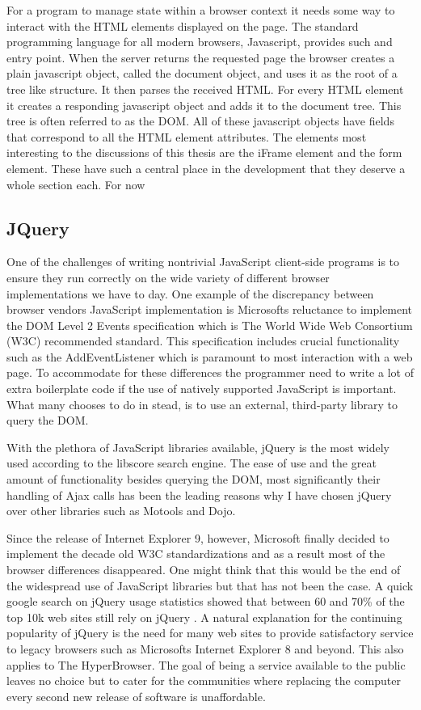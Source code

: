 \documentclass[english]{ifimaster}
\begin{document}
For a program to manage state within a browser context it needs some way to interact with the HTML elements displayed on the page. The standard programming language for all modern browsers, Javascript, provides such and entry point. When the server returns the requested page the browser creates a plain javascript object, called the document object, and uses it as the root of a tree like structure. It then parses the received HTML. For every HTML element it creates a responding javascript object and adds it to the document tree. This tree is often referred to as the DOM. All of these javascript objects have fields that correspond to all the HTML element attributes. The elements most interesting to the discussions of this thesis are the iFrame element and the form element. These have such a central place in the development that they deserve a whole section each. For now  

\subsection{JQuery}
One of the challenges of writing nontrivial JavaScript client-side programs is to ensure they run correctly on the wide variety of different browser implementations we have to day\parencite[p. 325]{flanagan}. One example of the discrepancy between browser vendors JavaScript implementation is Microsofts reluctance to implement the DOM Level 2 Events specification which is The World Wide Web Consortium (W3C) recommended standard\parencite{w3c}. This specification includes crucial functionality such as the AddEventListener which is paramount to most interaction with a web page. To accommodate for these differences the programmer need to write a lot of extra boilerplate code if the use of natively supported JavaScript is important. What many chooses to do in stead, is to use an external, third-party library to query the DOM. 

With the plethora of JavaScript libraries available, jQuery is the most widely used according to the libscore search engine\parencite{infoWorld}. The ease of use and the great amount of functionality besides querying the DOM, most significantly their handling of Ajax calls has been the leading reasons why I have chosen jQuery over other libraries such as Motools and Dojo. 

Since the release of Internet Explorer 9, however, Microsoft finally decided to implement the decade old W3C standardizations and as a result most of the browser differences disappeared. One might think that this would be the end of the widespread use of JavaScript libraries but that has not been the case. A quick google search on jQuery usage statistics showed that between 60 and 70\% of the top 10k web sites still rely on jQuery \parencite{jQueryWiki} \parencite{jQueryW3Tech}\parencite{builtWith}. A natural explanation for the continuing popularity of jQuery is the need for many web sites to provide satisfactory service to legacy browsers such as Microsofts Internet Explorer 8 and beyond. This also applies to The HyperBrowser. The goal of being a service available to the public leaves no choice but to cater for the communities where replacing the computer every second new release of software is unaffordable. 
\end{document}
